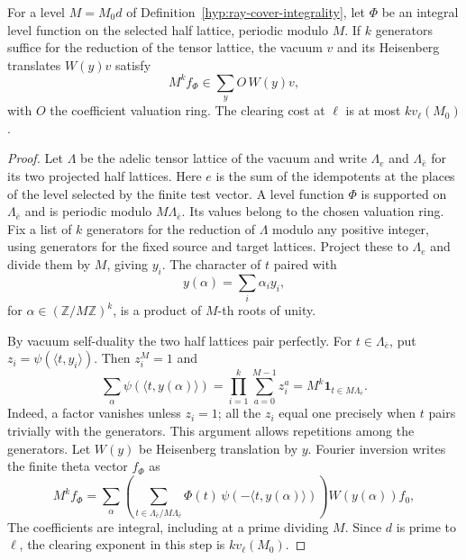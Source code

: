 \begin{auxlemma}\label{lem:cover-vacuum-fourier}
For a level \(M=M_0d\) of Definition~\ref{hyp:ray-cover-integrality},
let \(\Phi\) be an integral level function on the selected half
lattice, periodic modulo \(M\). If \(k\) generators suffice for
the reduction of the tensor lattice, the vacuum \(v\) and its Heisenberg translates \(W(y)v\) satisfy
\[
 M^k f_\Phi\in\sum_y O\,W(y)v,
\]
with \(O\) the coefficient valuation ring.
The clearing cost at \(\ell\) is at most \(k v_\ell(M_0)\).
\end{auxlemma}
\begin{proof}
Let \(\Lambda\) be the adelic tensor lattice of the vacuum
and write \(\Lambda_e\) and \(\Lambda_{\bar e}\) for its
two projected half lattices. Here \(e\) is the sum of the
idempotents at the places of the level selected by the finite
test vector. A level function \(\Phi\) is supported on
\(\Lambda_{\bar e}\) and is periodic modulo
\(M\Lambda_{\bar e}\). Its values belong to the chosen
valuation ring. Fix a list of \(k\) generators for the
reduction of \(\Lambda\) modulo any positive integer, using
generators for the fixed source and target lattices.
Project these to \(\Lambda_e\) and divide them by \(M\), giving
\(y_i\). The character of \(t\) paired with
\[
 y(\alpha)=\sum_i\alpha_i y_i,
\]
for
\(\alpha\in(\mathbb Z/M\mathbb Z)^k\), is a product of
\(M\)-th roots of unity.

By vacuum self-duality the two half lattices pair perfectly.
For \(t\in\Lambda_{\bar e}\), put \(z_i=\psi(\langle t,y_i\rangle)\).
Then \(z_i^M=1\) and
\[
 \sum_{\alpha}\psi(\langle t,y(\alpha)\rangle)
 =\prod_{i=1}^{k}\sum_{a=0}^{M-1}z_i^a
 =M^k\mathbf 1_{t\in M\Lambda_{\bar e}} .
\]
Indeed, a factor vanishes unless \(z_i=1\); all the \(z_i\) equal one
precisely when \(t\) pairs trivially with the generators. This argument
allows repetitions among the generators. Let \(W(y)\) be
Heisenberg translation by \(y\). Fourier inversion
writes the finite theta vector \(f_\Phi\) as
\[
 M^k f_\Phi
   =\sum_{\alpha}
       \left(\sum_{t\in\Lambda_{\bar e}/M\Lambda_{\bar e}}
             \Phi(t)\,\psi(-\langle t,y(\alpha)\rangle)\right)
             W(y(\alpha))f_0 ,
\]
The coefficients are integral, including at a prime dividing
\(M\). Since \(d\) is prime to \(\ell\), the clearing
exponent in this step is \(k v_\ell(M_0)\).
\end{proof}

